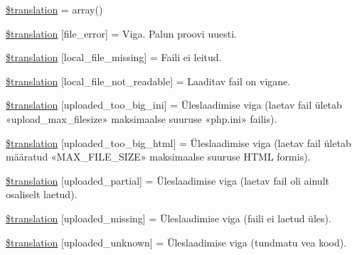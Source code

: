 \begin{DoxyCompactItemize}
\item 
\hyperlink{class_8upload_8et___e_e_8php_a1f198d410fecc3871ebdd468d343a5e3}{\$translation} = array()
\item 
\hyperlink{class_8upload_8et___e_e_8php_ac7498e49b9771b04698029aa61c70821}{\$translation} \mbox{[}\textquotesingle{}file\+\_\+error\textquotesingle{}\mbox{]} = \textquotesingle{}Viga. Palun proovi uuesti.\textquotesingle{}
\item 
\hyperlink{class_8upload_8et___e_e_8php_a6ec3d3a47ab70d77e7aa593e82ead10e}{\$translation} \mbox{[}\textquotesingle{}local\+\_\+file\+\_\+missing\textquotesingle{}\mbox{]} = \textquotesingle{}Faili ei leitud.\textquotesingle{}
\item 
\hyperlink{class_8upload_8et___e_e_8php_a60104befef9b241f3a7a6a755618a4b3}{\$translation} \mbox{[}\textquotesingle{}local\+\_\+file\+\_\+not\+\_\+readable\textquotesingle{}\mbox{]} = \textquotesingle{}Laaditav fail on vigane.\textquotesingle{}
\item 
\hyperlink{class_8upload_8et___e_e_8php_a6a08dcd0d3651fdd098568f6b2f0a42c}{\$translation} \mbox{[}\textquotesingle{}uploaded\+\_\+too\+\_\+big\+\_\+ini\textquotesingle{}\mbox{]} = \textquotesingle{}Üleslaadimise viga (laetav fail ületab «upload\+\_\+max\+\_\+filesize» maksimaalse suuruse «php.\+ini» failis).\textquotesingle{}
\item 
\hyperlink{class_8upload_8et___e_e_8php_a623d5b8b92169f57d7e43458aa911cbb}{\$translation} \mbox{[}\textquotesingle{}uploaded\+\_\+too\+\_\+big\+\_\+html\textquotesingle{}\mbox{]} = \textquotesingle{}Üleslaadimise viga (laetav fail ületab määratud «\+M\+A\+X\+\_\+\+F\+I\+L\+E\+\_\+\+S\+I\+Z\+E» maksimaalse suuruse H\+T\+M\+L formis).\textquotesingle{}
\item 
\hyperlink{class_8upload_8et___e_e_8php_a967c17da21b0a2d3bd65cca3a9ca0ea8}{\$translation} \mbox{[}\textquotesingle{}uploaded\+\_\+partial\textquotesingle{}\mbox{]} = \textquotesingle{}Üleslaadimise viga (laetav fail oli ainult osaliselt laetud).\textquotesingle{}
\item 
\hyperlink{class_8upload_8et___e_e_8php_a0cce433260be65f1f35853a6b4b8952b}{\$translation} \mbox{[}\textquotesingle{}uploaded\+\_\+missing\textquotesingle{}\mbox{]} = \textquotesingle{}Üleslaadimise viga (faili ei laetud üles).\textquotesingle{}
\item 
\hyperlink{class_8upload_8et___e_e_8php_a4a9168e922b827e6a28b5db1c00774ca}{\$translation} \mbox{[}\textquotesingle{}uploaded\+\_\+unknown\textquotesingle{}\mbox{]} = \textquotesingle{}Üleslaadimise viga (tundmatu vea kood).\textquotesingle{}

\end{DoxyCompactItemize}
